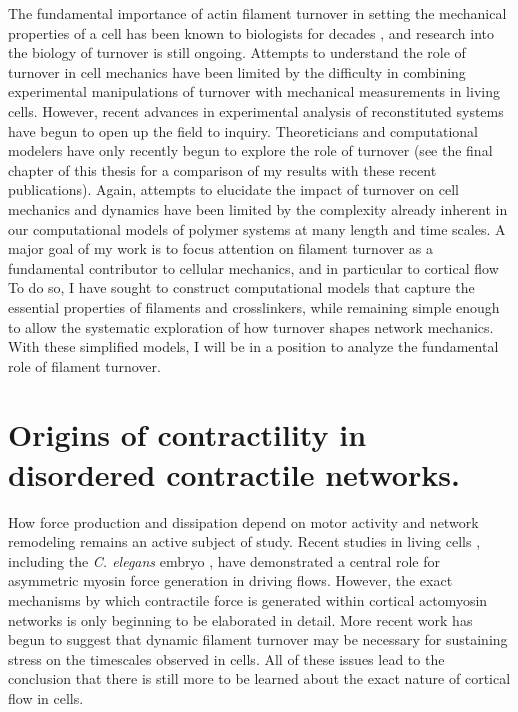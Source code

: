 The fundamental importance of actin filament turnover in setting the mechanical properties of a cell has been known to biologists for decades \cite{FEB2:FEB20014579387815132}, and research into the biology of turnover is still ongoing\cite{Fritzschee1501337}. Attempts to understand the role of turnover in cell mechanics have been limited by the difficulty in combining experimental manipulations of turnover with mechanical measurements in living cells.  However, recent advances in experimental analysis of reconstituted systems have begun to open up the field to inquiry.  
Theoreticians and computational modelers have only recently  begun to explore the role of turnover \cite{2015arXiv150706182H,Mak:2016aa,10.1371/journal.pone.0000696} (see the final chapter of this thesis for a comparison of my results with these recent publications). Again, attempts to elucidate the impact of turnover on cell mechanics and dynamics have been limited by the complexity already inherent in our computational models of polymer systems at many length and time scales\cite{Mak2015}. A major goal of my work is to focus attention on filament turnover as a fundamental contributor to cellular mechanics, and in particular to cortical flow  To do so, I have sought to construct computational models that capture the essential properties of filaments and crosslinkers, while remaining simple enough to allow the systematic exploration of how turnover shapes network mechanics. With these simplified models, I will  be in a position to analyze the fundamental role of filament turnover.


\section{Origins of contractility in disordered contractile networks.}

How force production and dissipation depend on motor activity and network remodeling remains an active subject of study.  Recent studies in living cells \cite{Hawkins20111041,amoeba4,PhysRevLett.116.028102}, including the \textit{C. elegans} embryo \cite{cellmech_flows}, have demonstrated a central role for asymmetric  myosin force generation in driving flows. However, the exact mechanisms by which contractile force is generated within cortical actomyosin networks is only beginning to be elaborated in detail\cite{PhysRevX.4.041002}.  More recent work \cite{Mak:2016aa} has begun to suggest that dynamic filament turnover may be necessary for sustaining stress on the timescales observed in cells.  All of these issues lead to the conclusion that there is still more to be learned about the exact nature of cortical flow in cells.

